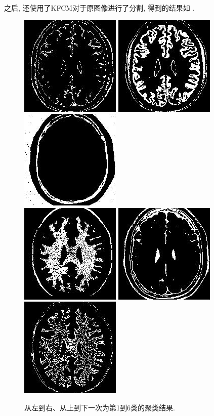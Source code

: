 \documentclass[lang=cn,11pt]{elegantpaper}
\begin{document}
之后, 还使用了KFCM对于原图像进行了分割, 得到的结果如 .

\begin{figure}[ht]
    \centering
    \includegraphics[width=.25\textwidth]{Brain/KFCM150/2020-03-19_21-10-05Kind3.jpg}
    \includegraphics[width=.25\textwidth]{Brain/KFCM150/2020-03-19_21-10-05Kind1.jpg}
    \includegraphics[width=.25\textwidth]{Brain/KFCM150/2020-03-19_21-10-05Kind5.jpg}\\

    \vspace{2pt}
    \includegraphics[width=.25\textwidth]{Brain/KFCM150/2020-03-19_21-10-05Kind4.jpg}
    \includegraphics[width=.25\textwidth]{Brain/KFCM150/2020-03-19_21-10-05Kind6.jpg}
    \includegraphics[width=.25\textwidth]{Brain/KFCM150/2020-03-19_21-10-05Kind2.jpg}
    \caption{从左到右、从上到下一次为第1到6类的聚类结果. \label{fig:KFCM}}
\end{figure}
\end{document}
